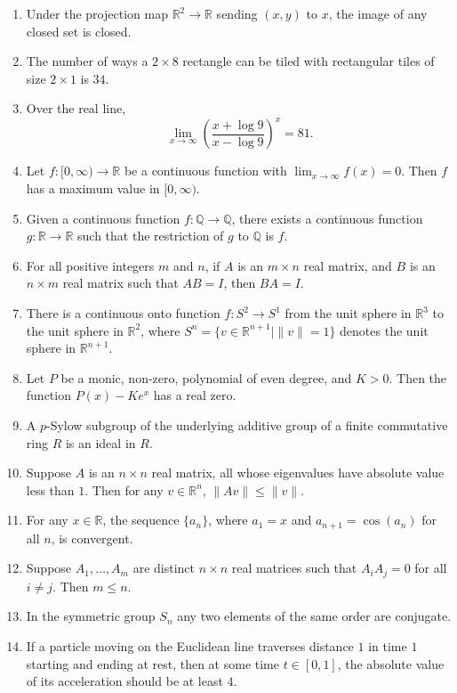 \documentclass[11pt, a4paper]{article}
\begin{document}
\begin{enumerate}
  \item Under the projection map $\mathbb{R}^2 \to \mathbb{R}$ sending $(x, y)$ to $x$, the image of any closed set is closed.
  \item The number of ways a $2 \times 8$ rectangle can be tiled with rectangular tiles of size $2 \times 1$ is $34$.
  \item Over the real line,
  \[
    \lim_{x \to \infty} \left(\frac{x + \log 9}{x - \log 9}\right)^x = 81.
  \]
  \item Let $f:[0,\infty) \to \mathbb{R}$ be a continuous function with $\lim_{x \to \infty} f(x) = 0$. Then $f$ has a maximum value in $[0,\infty)$.
  \item Given a continuous function $f:\mathbb{Q} \to \mathbb{Q}$, there exists a continuous function $g:\mathbb{R} \to \mathbb{R}$ such that the restriction of $g$ to $\mathbb{Q}$ is $f$.
  \item For all positive integers $m$ and $n$, if $A$ is an $m \times n$ real matrix, and $B$ is an $n \times m$ real matrix such that $AB = I$, then $BA = I$.
  \item There is a continuous onto function $f: S^2 \to S^1$ from the unit sphere in $\mathbb{R}^3$ to the unit sphere in $\mathbb{R}^2$, where $S^n = \{v \in \mathbb{R}^{n+1} \mid \|v\| = 1\}$ denotes the unit sphere in $\mathbb{R}^{n+1}$.
  \item Let $P$ be a monic, non-zero, polynomial of even degree, and $K > 0$. Then the function $P(x) - K e^x$ has a real zero.
  \item A $p$-Sylow subgroup of the underlying additive group of a finite commutative ring $R$ is an ideal in $R$.
  \item Suppose $A$ is an $n \times n$ real matrix, all whose eigenvalues have absolute value less than $1$. Then for any $v \in \mathbb{R}^n$, $\|Av\| \le \|v\|$.
  \item For any $x \in \mathbb{R}$, the sequence $\{a_n\}$, where $a_1 = x$ and $a_{n+1} = \cos(a_n)$ for all $n$, is convergent.
  \item Suppose $A_1, \dots, A_m$ are distinct $n \times n$ real matrices such that $A_i A_j = 0$ for all $i \ne j$. Then $m \le n$.
  \item In the symmetric group $S_n$ any two elements of the same order are conjugate.
  \item If a particle moving on the Euclidean line traverses distance $1$ in time $1$ starting and ending at rest, then at some time $t \in [0,1]$, the absolute value of its acceleration should be at least $4$.

\end{enumerate}
\end{document}
